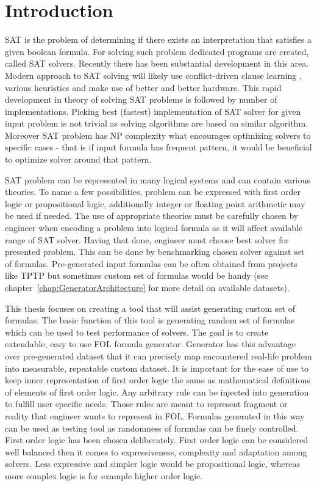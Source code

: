 \chapter{Introduction} \label{cha:Introduction}

\gls{SAT} is the problem of determining if there exists an interpretation that satisfies a given boolean formula. For solving such problem dedicated programs are created, called SAT solvers. Recently there has been substantial development in this area. Modern approach to SAT solving will likely use conflict-driven clause learning \cite{series/faia/SilvaLM09}, various heuristics and make use of better and better hardware. This rapid development in theory of solving SAT problems is followed by number of implementations. Picking best (fastest) implementation of SAT solver for given input problem is not trivial as solving algorithms are based on similar algorithm. Moreover SAT problem has NP complexity what encourages optimizing solvers to specific cases - that is if input formula has frequent pattern, it would be beneficial to optimize solver around that pattern.

SAT problem can be represented in many logical systems and can contain various theories. To name a few possibilities, problem can be expressed with first order logic or propositional logic, additionally integer or floating point arithmetic may be used if needed. The use of appropriate theories must be carefully chosen by engineer when encoding a problem into logical formula as it will affect available range of SAT solver. Having that done, engineer must choose best solver for presented problem. This can be done by benchmarking chosen solver against set of formulas. Pre-generated input formulas can be often obtained from projects like \gls{TPTP} but sometimes custom set of formulas would be handy (see chapter~\ref{chap:GeneratorArchitecture} for more detail on available datasets).

This thesis focuses on creating a tool that will assist generating custom set of formulas. The basic function of this tool is generating random set of formulas which can be used to test performance of solvers. 
The goal is to create extendable, easy to use \gls{FOL} formula generator.
Generator has this advantage over pre-generated dataset that it can precisely map encountered real-life problem into measurable, repeatable custom dataset. It is important for the ease of use to keep inner representation of first order logic the same as mathematical definitions of elements of first order logic. Any arbitrary rule can be injected into generation to fulfill user specific needs. Those rules are meant to represent fragment or reality that engineer wants to represent in \gls{FOL}. Formulas generated in this way can be used as testing tool as randomness of formulas can be finely controlled. 
First order logic has been chosen deliberately. First order logic can be considered well balanced then it comes to expressiveness, complexity and adaptation among solvers. Less expressive and simpler logic would be propositional logic, whereas more complex logic is for example higher order logic. 

